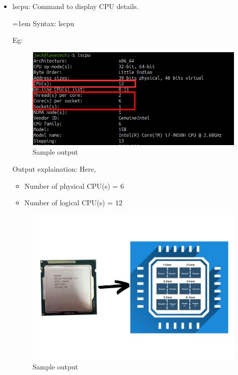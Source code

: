 \setlength{\columnsep}{3pt}
\begin{flushleft}
\begin{itemize}
	\item lscpu: Command to display CPU details.
	\begin{tcolorbox}[breakable,notitle,boxrule=-0pt,colback=pink,colframe=pink]
		\color{black}
		\font=1em
		Syntax: lscpu
		\font=4pt
	\end{tcolorbox}
	Eg:
	\begin{figure}[h!]
		\centering
		\includegraphics[scale=.45]{content/chapter12/images/cpu1.png}
		\caption{Sample output}
		\label{fig:cpu1}
	\end{figure}
	
	Output explaination: Here,
	\begin{itemize}
		\item Number of physical CPU(s) = 6
		\item Number of logical CPU(s) = 12
	\end{itemize}	
	
	\begin{figure}[h!]
		\centering
		\includegraphics[scale=.45]{content/chapter12/images/intel.png}
		\caption{Sample output}
		\label{fig:cpu1}
	\end{figure}
	\newpage
	

\end{itemize}
\end{flushleft}
